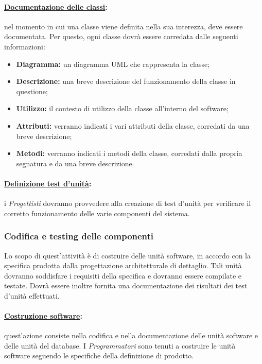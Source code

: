 \paragraph{\underline{Documentazione delle classi}:} nel momento in cui una classe viene definita nella sua interezza, deve essere documentata. Per questo, ogni classe dovrà essere corredata dalle seguenti informazioni:
\begin{itemize}
\item\textbf{Diagramma:} un diagramma UML\g{} che rappresenta la classe;
\item\textbf{Descrizione:} una breve descrizione del funzionamento della classe in questione;
\item\textbf{Utilizzo:} il contesto di utilizzo della classe all'interno del software;
\item\textbf{Attributi:} verranno indicati i vari attributi della classe, corredati da una breve descrizione;
\item\textbf{Metodi:} verranno indicati i metodi della classe, corredati dalla propria segnatura e da una breve descrizione.
\end{itemize}

\paragraph{\underline{Definizione test d'unità}:} i \textit{Progettisti} dovranno provvedere alla creazione di test d'unità per verificare il corretto funzionamento delle varie componenti del sistema.


\subsubsection{Codifica e testing delle componenti}
\label{codifica}
Lo scopo di quest'attività è di costruire delle unità software, in accordo con la specifica prodotta dalla progettazione architetturale di dettaglio. Tali unità dovranno soddisfare i requisiti della specifica e dovranno essere compilate e testate. Dovrà essere inoltre fornita una documentazione dei risultati dei test d'unità effettuati.

\paragraph{\underline{Costruzione software}:} quest'azione consiste nella codifica e nella documentazione delle unità software e delle unità del database. I \textit{Programmatori} sono tenuti a costruire le unità software seguendo le specifiche della definizione di prodotto.

